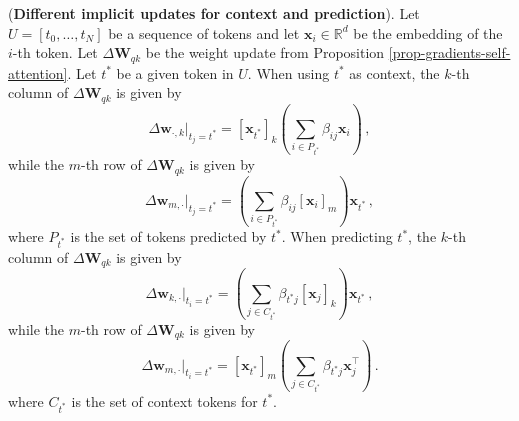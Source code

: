 \begin{proposition}
\label{prop-gradient-columns-rows}
%
(\textbf{Different implicit updates for context and prediction}).
%
%
Let $U = [t_0, \dots, t_N]$ be a sequence of tokens and let $\bm{x}_i \in \mathbb{R}^d$ be the embedding of the $i$-th token. 
%
Let $\Delta \bm{W}_{qk}$ be the weight update from Proposition \ref{prop-gradients-self-attention}.
%
Let $t^*$ be a given token in $U$.
%
When using $t^*$ as context, the $k$-th column of $\Delta \bm{W}_{qk}$ is given by
%
\begin{equation}
    \Delta \bm{w}_{\cdot, k} \bigg|_{t_j = t^*}= [\bm{x}_{t^*}]_k \left(\sum_{i \in P_{t^*}}\beta_{ij}\bm{x}_i\right)\,,
\end{equation}
%
while the $m$-th row of $\Delta \bm{W}_{qk}$ is given by
%
\begin{equation}
    \Delta \bm{w}_{m, \cdot} \bigg|_{t_j = t^*}= \left(\sum_{i \in P_{t^*}}\beta_{ij}[\bm{x}_i]_m\right)\bm{x}_{t^*} \,,
\end{equation}
%
where $P_{t^*}$ is the set of tokens predicted by $t^*$.
%
When predicting $t^*$, the $k$-th column of $\Delta \bm{W}_{qk}$ is given by
%
\begin{equation}
    \Delta \bm{w}_{k, \cdot} \bigg|_{t_i = t^*} = \left(\sum_{j \in C_{t^*}}\beta_{t^*j}[\bm{x}_j]_k\right)\bm{x}_{t^*} \,,
\end{equation}
%
while the $m$-th row of $\Delta \bm{W}_{qk}$ is given by
%
\begin{equation}
    \Delta \bm{w}_{m, \cdot} \bigg|_{t_i = t^*} = [\bm{x}_{t^*}]_m \left(\sum_{j \in C_{t^*}}\beta_{t^*j}\bm{x}_j^\top\right)\,.
\end{equation}
%
where $C_{t^*}$ is the set of context tokens for $t^*$.
%
\end{proposition}
%

